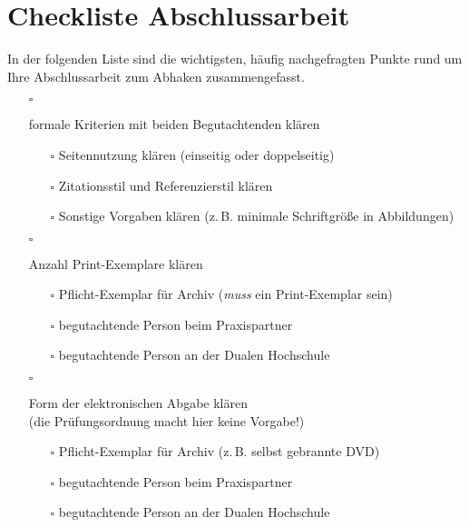 \pagestyle{empty}
\cleardoublepage
{}
\renewcommand{\thefootnote}{\alph{footnote}}
\setcounter{footnote}{0}
\chapter*{Checkliste Abschlussarbeit}
In der folgenden Liste sind die wichtigsten, häufig nachgefragten Punkte rund um Ihre Abschlussarbeit zum Abhaken zusammengefasst.

\begin{itemize}
    \item[$\square$]{
        formale Kriterien mit beiden Begutachtenden klären
        \begin{itemize}
            \item[$\square$] Seitennutzung klären (einseitig oder doppelseitig)
            \item[$\square$] Zitationsstil und Referenzierstil klären
            \item[$\square$]{
                Sonstige Vorgaben klären (z.\,B. minimale Schriftgröße in Abbildungen)
            }
        \end{itemize}
    }
    \item[$\square$]{
        Anzahl Print-Exemplare klären
        \begin{itemize}
            \item[$\square$] Pflicht-Exemplar für Archiv (\emph{muss} ein Print-Exemplar sein)
            \item[$\square$] begutachtende Person beim Praxispartner
            \item[$\square$] begutachtende Person an der Dualen Hochschule
        \end{itemize}
    }
    \item[$\square$]{
        Form der elektronischen Abgabe klären\\
        (die Prüfungsordnung macht hier keine Vorgabe!)
        \begin{itemize}
            \item[$\square$] Pflicht-Exemplar für Archiv (z.\,B. selbst gebrannte DVD)
            \item[$\square$] begutachtende Person beim Praxispartner
            \item[$\square$] begutachtende Person an der Dualen Hochschule
        \end{itemize}
}
\end{itemize}

